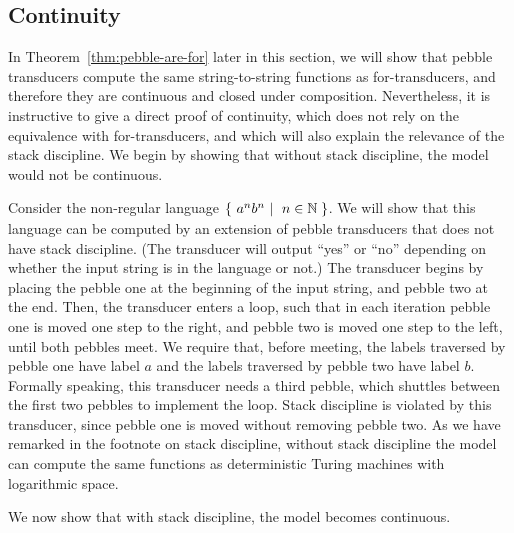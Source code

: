 \subsection{Continuity}
\label{sec:continuity-pebble}
In Theorem~\ref{thm:pebble-are-for} later in this section, we will show that pebble transducers compute the same string-to-string functions as for-transducers, and therefore they are continuous and closed under composition. Nevertheless, it is instructive to give a direct proof of continuity, which does not rely on the equivalence with for-transducers, and which will also explain the relevance of the stack discipline. We begin by showing that without stack discipline, the model would not be continuous.

\begin{myexample}
    \label{ex:importance-of-stack-discipline}
    Consider the non-regular language $\setbuild{a^n b^n}{$n \in \Nat$}$. We will show that this language can be computed by an extension of pebble transducers that does not have stack discipline. (The transducer will output ``yes'' or ``no'' depending on whether the input string is in the language or not.) The transducer begins by placing the pebble one at the beginning of the input string, and pebble two at the end. Then, the transducer enters a loop, such that in each iteration pebble one is moved one step to the right, and pebble two is moved one step to the left, until both pebbles meet. We require that, before meeting, the labels traversed by pebble one have label $a$ and the labels traversed by pebble two have label $b$. Formally speaking, this transducer needs a third pebble, which shuttles between the first two pebbles to implement the loop. Stack discipline is violated by this transducer, since pebble one is moved without removing pebble two.  As we have remarked in the footnote on stack discipline, without stack discipline the model can compute the same functions as deterministic Turing machines with logarithmic space.
\end{myexample}


We now show that with stack discipline, the model becomes continuous.

